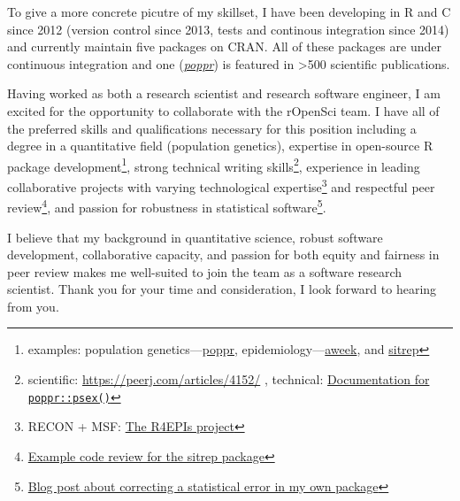 To give a more concrete picutre of my skillset, I have been developing in R and
C since 2012 (version control since 2013, tests and continous integration since 
2014) and currently maintain five packages on CRAN. All of these packages are
under continuous integration and one
(\href{https://grunwaldlab.github.io/poppr}{\textit{poppr}}) is featured in
\textgreater500 scientific publications.  

Having worked as both a research scientist and research software engineer, I am
excited for the opportunity to collaborate with the rOpenSci team. I have all
of the preferred skills and qualifications necessary for this position
including a degree in a quantitative field (population genetics), expertise in
open-source R package development\footnote{examples: population genetics---\href{https://grunwaldlab.github.io/poppr}{poppr}, epidemiology---\href{https://www.repidemicsconsortium.org/aweek}{aweek}, and
\href{https://github.com/R4EPI/sitrep}{sitrep}}, strong technical writing
skills\footnote{scientific: \url{https://peerj.com/articles/4152/} , technical:
\href{https://grunwaldlab.github.io/poppr/reference/psex.html}{Documentation
for \texttt{poppr::psex()}}}, experience in leading collaborative
projects with varying technological expertise\footnote{RECON + MSF: \href{https://R4EPIs.netlify.com}{The R4EPIs
project}} and respectful peer
review\footnote{\href{https://github.com/R4EPI/sitrep/pull/76}{Example code
review for the sitrep package}}, and passion for robustness in statistical
software\footnote{\href{https://zkamvar.netlify.com/post/2017-09-23-squish/squish}{Blog
post about correcting a statistical error in my own package}}.

I believe that my background in quantitative science, robust software
development, collaborative capacity, and passion for both equity and 
fairness in peer review makes me well-suited to join the team as a software
research scientist. Thank you for your time and consideration,
I look forward to hearing from you. 

\makeletterclosing %

\clearpage




